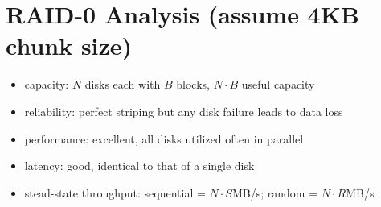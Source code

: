 \section*{RAID-0 Analysis (assume 4KB chunk size)}
\begin{itemize}
\item capacity: $N$ disks each with $B$ blocks, $N\cdot B$ useful capacity
\item reliability: perfect striping but any disk failure leads to data loss
\item performance: excellent, all disks utilized often in parallel
\item latency: good, identical to that of a single disk
\item stead-state throughput: sequential = $N \cdot S$MB/s; random = $N\cdot R$MB/s
\end{itemize}
